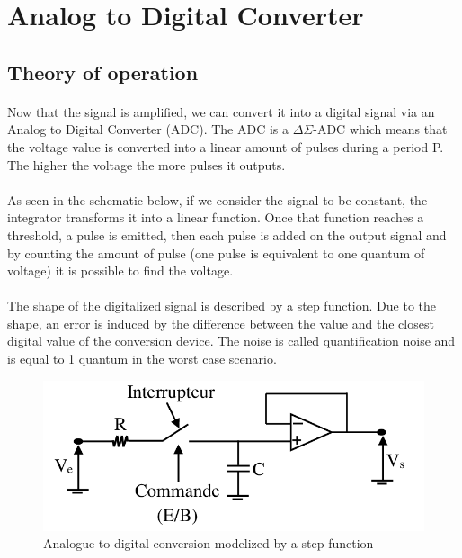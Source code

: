 \documentclass{article}[12pt]
\begin{document}
\section{Analog to Digital Converter}
\subsection{Theory of operation}
\paragraph{}
Now that the signal is amplified, we can convert it into a digital signal via an Analog to Digital Converter (ADC).
The ADC is a $\Delta$$\Sigma$-ADC which means that the voltage value is converted into a linear amount of pulses during a period P. 
The higher the voltage the more pulses it outputs.
\paragraph{}
As seen in the schematic below, if we consider the signal to be constant, the integrator transforms it into a linear function.
Once that function reaches a threshold, a pulse is emitted, then each pulse is added on the output signal and by counting the amount of pulse (one pulse is equivalent to one quantum of voltage) it is possible to find the voltage.\\
\paragraph{}
The shape of the digitalized signal is described by a step function. Due to the shape, an error is induced by the difference between the value and the closest digital value of the conversion device. The noise is called quantification noise and is equal to 1 quantum in the worst case scenario.
\begin{figure}[H]
    \centering
    \includegraphics[width=.6\textwidth]{figures/echantilloneur.png}
    \caption{Analogue to digital conversion modelized by a step function}
    \label{fig:CAN_ech}
\end{figure}
\end{document}
